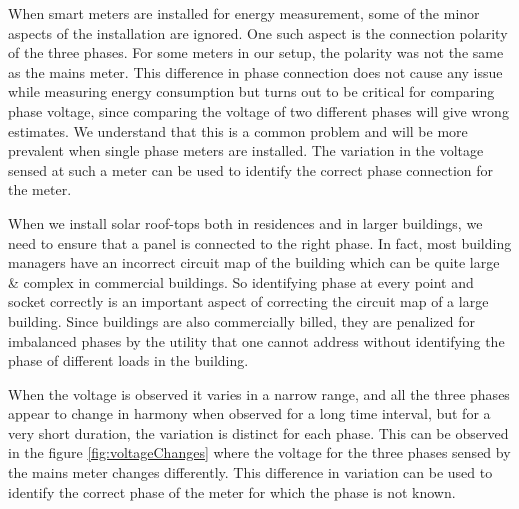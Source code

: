 When smart meters are installed for energy measurement, some of the minor aspects of the installation are ignored. One such aspect is the connection polarity of the three phases. For some meters in our setup, the polarity was not the same as the mains meter. This difference in phase connection does not cause any issue while measuring energy consumption but turns out to be critical for comparing phase voltage, since comparing the voltage of two different phases will give wrong estimates. We understand that this is a common problem and will be more prevalent when single phase meters are installed. The variation in the voltage sensed at such a meter can be used to identify the correct phase connection for the meter.

When we install solar roof-tops both in residences and in larger buildings, we need to ensure that  a panel is connected to the right phase. In fact, most building managers have an incorrect circuit map of the building which can be quite large \& complex in commercial buildings. So identifying phase at every point and socket correctly is an important aspect of correcting the circuit map of a large building. Since buildings are also commercially billed, they are penalized for imbalanced phases by the utility that one cannot address without identifying the phase of different loads in the building.

When the voltage is observed it varies in a narrow range, and all the three phases appear to change in harmony when observed for a long time interval, but for a very short duration, the variation is distinct for each phase. This can be observed in the figure \ref{fig:voltageChanges} where the voltage for the three phases sensed by the mains meter changes differently. This difference in variation can be used to identify the correct phase of the meter for which the phase is not known.

